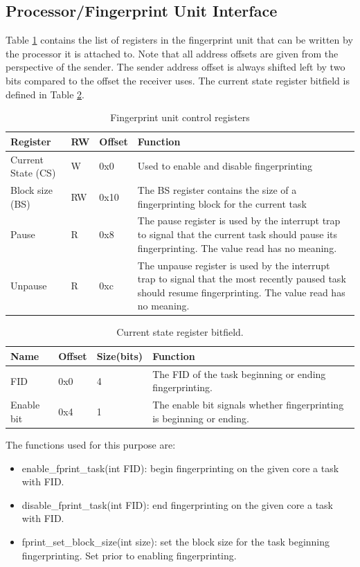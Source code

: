 \subsection{Processor/Fingerprint Unit Interface}
Table \ref{t:fprint_reg} contains the list of registers in the fingerprint unit that can be written by the processor it is attached to. Note that all address offsets are given from the perspective of the sender. The sender address offset is always shifted left by two bits compared to the offset the receiver uses. The current state register bitfield is defined in Table \ref{t:cs_bitfield}.
\begin{table}
\centering
    \begin{tabular}{| l | l | l  | p{6cm} |}
    \hline
    Register & RW & Offset & Function\\ \hline
    Current State (CS) & W & 0x0 & Used to enable and disable fingerprinting\\ \hline
    Block size (BS) & RW & 0x10 & The BS register contains the size of a fingerprinting block for the current task\\ \hline
    Pause  & R & 0x8 & The pause register is used by the interrupt trap to signal that the current task should pause its fingerprinting. The value read has no meaning.\\ \hline
    Unpause & R & 0xc & The unpause register is used by the interrupt trap to signal that the most recently paused task should resume fingerprinting. The value read has no meaning.\\ \hline
    \end{tabular}
    \caption{Fingerprint unit control registers}
    \label{t:fprint_reg}
\end{table}


\begin{table}
\centering
    \begin{tabular}{| l | l | l | p{6cm} |}
    \hline
    Name & Offset & Size(bits) & Function\\ \hline
    FID & 0x0 & 4 & The FID of the task beginning or ending fingerprinting.\\ \hline
    Enable bit & 0x4 & 1 & The enable bit signals whether fingerprinting is beginning or ending.\\ \hline
    \end{tabular}
    \caption{Current state register bitfield.}
    \label{t:cs_bitfield}
\end{table}

The functions used for this purpose are:
\begin{itemize}
\item{enable\_fprint\_task(int FID): begin fingerprinting on the given core a task with FID.} 
\item{disable\_fprint\_task(int FID): end fingerprinting on the given core a task with FID.}
\item{fprint\_set\_block\_size(int size): set the block size for the task beginning fingerprinting. Set prior to enabling fingerprinting.}
\end{itemize}

